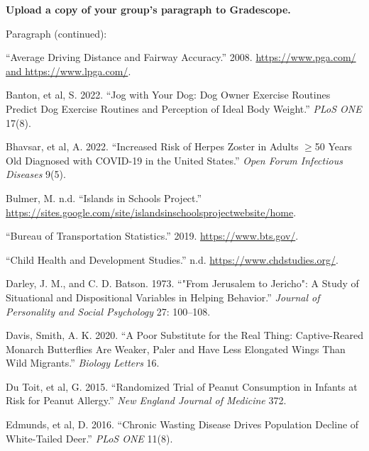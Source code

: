 \documentclass[
]{report}
\newlength{\cslhangindent}
\newenvironment{CSLReferences}[2] %
 {\begin{list}{}{%
  \setlength{\itemindent}{0pt}
  \setlength{\leftmargin}{0pt}
  \setlength{\parsep}{0pt}
  \ifodd #1
   \setlength{\leftmargin}{\cslhangindent}
   \setlength{\itemindent}{-1\cslhangindent}
  \fi
  \setlength{\itemsep}{#2\baselineskip}}}
 {\end{list}}
\begin{document}
\textbf{Upload a copy of your group's paragraph to Gradescope.}

\newpage

Paragraph (continued):

\newpage

\label{refs}
\begin{CSLReferences}{1}{0}
{``Average Driving Distance and Fairway Accuracy.''} 2008. \href{https://www.pga.com/\%20and\%20https://www.lpga.com/}{https://www.pga.com/ and https://www.lpga.com/}.

Banton, et al, S. 2022. {``Jog with Your Dog: Dog Owner Exercise Routines Predict Dog Exercise Routines and Perception of Ideal Body Weight.''} \emph{PLoS ONE} 17(8).

Bhavsar, et al, A. 2022. {``Increased Risk of Herpes Zoster in Adults \(\geq\)50 Years Old Diagnosed with COVID-19 in the United States.''} \emph{Open Forum Infectious Diseases} 9(5).

Bulmer, M. n.d. {``Islands in Schools Project.''} \url{https://sites.google.com/site/islandsinschoolsprojectwebsite/home}.

{``Bureau of Transportation Statistics.''} 2019. \url{https://www.bts.gov/}.

{``Child Health and Development Studies.''} n.d. \url{https://www.chdstudies.org/}.

Darley, J. M., and C. D. Batson. 1973. {``"From Jerusalem to Jericho": A Study of Situational and Dispositional Variables in Helping Behavior.''} \emph{Journal of Personality and Social Psychology} 27: 100--108.

Davis, Smith, A. K. 2020. {``A Poor Substitute for the Real Thing: Captive-Reared Monarch Butterflies Are Weaker, Paler and Have Less Elongated Wings Than Wild Migrants.''} \emph{Biology Letters} 16.

Du Toit, et al, G. 2015. {``Randomized Trial of Peanut Consumption in Infants at Risk for Peanut Allergy.''} \emph{New England Journal of Medicine} 372.

Edmunds, et al, D. 2016. {``Chronic Wasting Disease Drives Population Decline of White-Tailed Deer.''} \emph{PLoS ONE} 11(8).


\end{CSLReferences}
\end{document}
